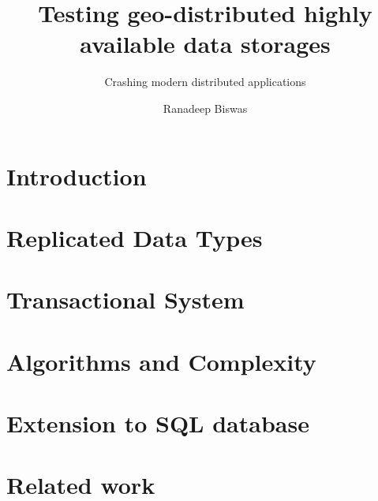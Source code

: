 \documentclass{mimosis}
\title{Testing geo-distributed highly available data storages}
\subtitle{Crashing modern distributed applications}
\author{Ranadeep Biswas}
\begin{document}
\frontmatter
  
  

  \tableofcontents

\mainmatter

  \chapter{Introduction}


  \chapter{Replicated Data Types}

  
  

  \chapter{Transactional System}
  
  
  

  \chapter{Algorithms and Complexity}

  
  
  
  

  
  

  \chapter{Extension to SQL database}

  
  
  
  
  
  
  
  

  \chapter{Related work}
\end{document}
